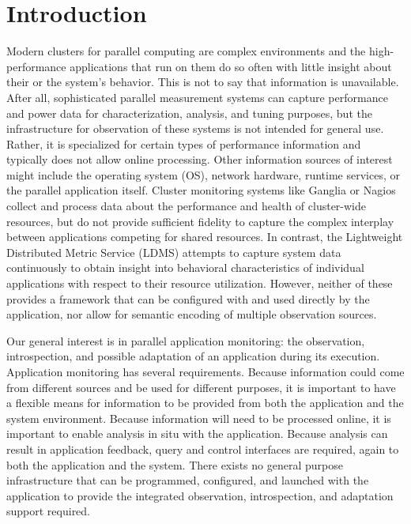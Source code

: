 
\section{Introduction}
Modern clusters for parallel computing are complex environments and
the high-performance applications that run on them do so often with
little insight about their or the system's behavior.
%
This is not to say that information is unavailable.  After all,
sophisticated parallel measurement systems can capture performance and
power data for characterization, analysis, and tuning purposes, but
the infrastructure for observation of these systems is not intended
for general use.
%
Rather, it is specialized for certain types of performance information
and typically does not allow online processing.
%
Other information sources of interest might include the
operating system (OS), network hardware, runtime services, or the
parallel application itself.
%
Cluster monitoring systems like Ganglia \cite{massie2004ganglia} or
Nagios \cite{katsaros2011building} collect and process data about the
performance and health of cluster-wide resources, but do not provide
sufficient fidelity to capture the complex interplay between
applications competing for shared resources.
%
In contrast, the Lightweight Distributed Metric Service
\cite{agelastos2014lightweight} (LDMS) attempts to capture system data
continuously to obtain insight into behavioral characteristics of
individual applications with respect to their resource utilization.
%
However, neither of these provides a framework that can be configured
with and used directly by the application, nor allow for semantic
encoding of multiple observation sources.

Our general interest is in parallel application monitoring: the
observation, introspection, and possible adaptation of an application
during its execution.
%
Application monitoring has several requirements.  Because information
could come from different sources and be used for different purposes,
it is important to have a flexible means for information to be
provided from both the application and the system environment.
%
Because information will need to be processed online, it is important
to enable analysis in situ with the application.
%
Because analysis can result in application feedback, query and control
interfaces are required, again to both the application and the system.
%
There exists no general purpose infrastructure that can be programmed,
configured, and launched with the application to provide the
integrated observation, introspection, and adaptation support
required.

